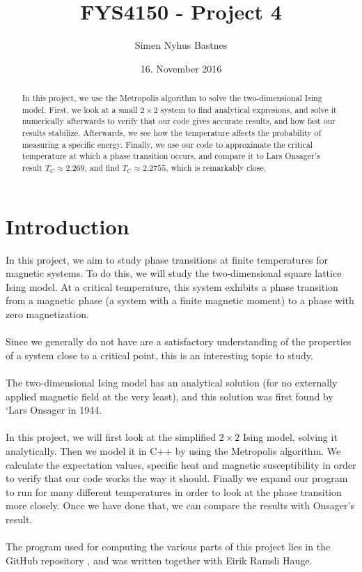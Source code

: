 \documentclass{article}
\title{FYS4150 - Project 4}
\author{Simen Nyhus Bastnes}
\date{16. November 2016}
\begin{document}
\maketitle
\begin{abstract}
In this project, we use the Metropolis algorithm to solve the two-dimensional Ising model. First, we look at a small $2\times2$ system to find analytical expresions, and solve it numerically afterwards to verify that our code gives accurate results, and how fast our results stabilize. Afterwards, we see how the temperature affects the probability of measuring a specific energy. Finally, we use our code to approximate the critical temperature at which a phase transition occurs, and compare it to Lars Onsager's result $T_C\approx 2.269$, and find $T_C \approx 2.2755$, which is remarkably close.
\end{abstract}

\section{Introduction}
In this project, we aim to study phase transitions at finite temperatures for magnetic systems. To do this, we will study the two-dimensional square lattice Ising model. At a critical temperature, this system exhibits a phase transition from a magnetic phase (a system with a finite magnetic moment) to a phase with zero magnetization.\\\\
Since we generally do not have are a satisfactory understanding of the properties of a system close to a critical point, this is an interesting topic to study.\\\\
The two-dimensional Ising model has an analytical solution (for no externally applied magnetic field at the very least), and this solution was first found by `Lars Onsager in 1944.\\\\
In this project, we will first look at the simplified $2\times2$ Ising model, solving it analytically. Then we model it in C++ by using the Metropolis algorithm. We calculate the expectation values, specific heat and magnetic susceptibility in order to verify that our code works the way it should. Finally we expand our program to run for many different temperatures in order to look at the phase transition more closely. Once we have done that, we can compare the results with Onsager's result.\\\\
The program used for computing the various parts of this project lies in the GitHub repository \cite{cite:github}, and was written together with Eirik Ramsli Hauge.
\end{document}
